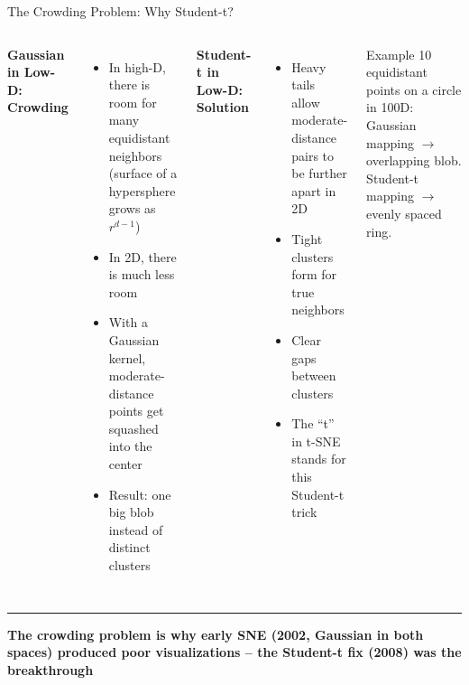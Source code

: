 \documentclass[8pt,aspectratio=169]{beamer}
\newcommand{\bottomnote}[1]{%
\vfill
\vspace{-2mm}
\textcolor{mllavender2}{\rule{\textwidth}{0.4pt}}
\vspace{1mm}
\footnotesize
\textbf{#1}
}
\newenvironment{compactlist}{%
  \begin{itemize}%
    \setlength{\itemsep}{2pt}%
    \setlength{\parskip}{0pt}%
    \setlength{\parsep}{0pt}%
}{%
  \end{itemize}%
}
\begin{document}
\begin{frame}[t]{The Crowding Problem: Why Student-t?}
\begin{columns}[T]
\small
\textbf{Gaussian in Low-D: Crowding}
\begin{compactlist}
\item In high-D, there is room for many equidistant neighbors (surface of a hypersphere grows as $r^{d-1}$)
\item In 2D, there is much less room
\item With a Gaussian kernel, moderate-distance points get squashed into the center
\item Result: one big blob instead of distinct clusters
\end{compactlist}

\small
\textbf{Student-t in Low-D: Solution}
\begin{compactlist}
\item Heavy tails allow moderate-distance pairs to be further apart in 2D
\item Tight clusters form for true neighbors
\item Clear gaps between clusters
\item The ``t'' in t-SNE stands for this Student-t trick
\end{compactlist}

\vspace{2mm}
\begin{block}{Example}
\scriptsize 10 equidistant points on a circle in 100D: Gaussian mapping $\rightarrow$ overlapping blob. Student-t mapping $\rightarrow$ evenly spaced ring.
\end{block}
\end{columns}

\bottomnote{The crowding problem is why early SNE (2002, Gaussian in both spaces) produced poor visualizations -- the Student-t fix (2008) was the breakthrough}
\end{frame}
\end{document}
